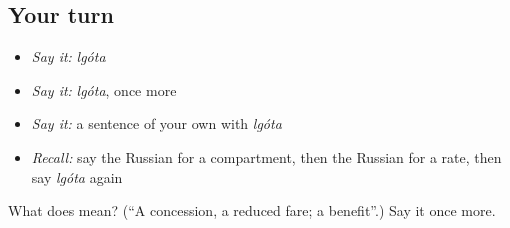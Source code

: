 \subsection*{Your turn}
\begin{itemize}
\raggedright
  \item \emph{Say it:} \emph{lgóta}
  \item \emph{Say it:} \emph{lgóta}, once more
  \item \emph{Say it:} a sentence of your own with \emph{lgóta}
  \item \emph{Recall:} say the Russian for a compartment, then the Russian for a rate, then say \emph{lgóta} again
\end{itemize}

\begin{tcolorbox}[breakable,colback=teal!4,colframe=teal!35!black,title={Before you move on}]
What does  mean? (\textquotedblleft{}A concession, a reduced fare; a benefit\textquotedblright{}.) Say it once more.
\end{tcolorbox}
